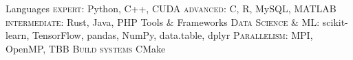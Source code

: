 \begin{cvskills}
  \cvskill
    {Languages} %
    {\textsc{expert}: Python, C++, CUDA \quad \textsc{advanced}: C, R, MySQL, MATLAB \quad \textsc{intermediate}: Rust, Java, PHP} %
  \cvskill
    {Tools \& Frameworks} %
    {\textsc{Data Science \& ML}: scikit-learn, TensorFlow, pandas, NumPy, data.table, dplyr \quad \textsc{Parallelism}: MPI, OpenMP, TBB \quad \textsc{Build systems} CMake} %
\end{cvskills}